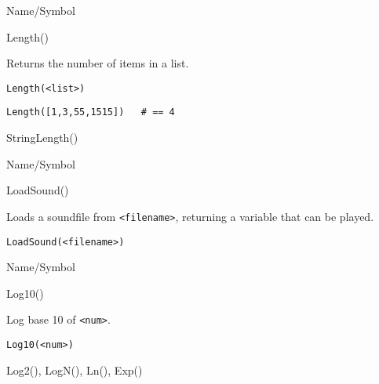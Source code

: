\rl




\begin{desc}{Name/Symbol}
\item[Name/Symbol]	Length()

\item[Description]	Returns the number of items in a list.

\item[Usage]
\begin{verbatim}
Length(<list>)
\end{verbatim}

\item[Example]
\begin{verbatim}
Length([1,3,55,1515])	# == 4
\end{verbatim}

\item[See Also]	StringLength()
\end{desc}

\rl



\begin{desc}{Name/Symbol}
\item[Name/Symbol]	LoadSound()

\item[Description]	Loads a soundfile from \verb+<filename>+, 
		returning a variable that can be played.

\item[Usage]
\begin{verbatim}
LoadSound(<filename>)
\end{verbatim}

\item[Example]	

\item[See Also]	
\end{desc}

\rl



\begin{desc}{Name/Symbol}
\item[Name/Symbol]	Log10()

\item[Description]	Log base 10 of \verb+<num>+.

\item[Usage]
\begin{verbatim}
Log10(<num>)
\end{verbatim}

\item[Example]	

\item[See Also]	Log2(), LogN(), Ln(), Exp()
\end{desc}

